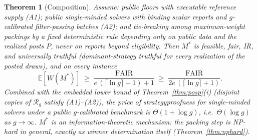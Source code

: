 \documentclass[11pt]{article}
\newtheorem{theorem}{Theorem}
\theoremstyle{remark}
\newcommand{\FAIR}{\mathrm{FAIR}}
\newcommand{\E}{\mathbb{E}}
\begin{document}
\begin{theorem}[Composition]\label{thm:composition}
Assume: public floors with executable reference supply (A1); public
single-minded solvers with binding scalar reports and $g$-calibrated
filter-passing batches (A2); and tie-breaking among maximum-weight
packings by a fixed deterministic rule depending only on public data and
the realized posts $P$, never on reports beyond eligibility. Then
$M^\ast$ is feasible, fair, IR, and universally truthful
(dominant-strategy truthful for every realization of the posted draws),
and on every instance
\[
\E[W(M^\ast)]\;\ge\;\frac{\FAIR}{e\,(\lceil\ln g\rceil+1)+1}
\;\ge\;\frac{\FAIR}{2e\,(\lceil\ln g\rceil+1)} .
\]
Combined with the embedded lower bound of Theorem~\ref{thm:posp}(i)
(disjoint copies of $\mathcal R_g$ satisfy (A1)--(A2)), the price of
strategyproofness for single-minded solvers under a public $g$-calibrated
benchmark is $\Theta(1+\log g)$, i.e.\ $\Theta(\log g)$ as
$g\to\infty$. $M^\ast$ is an information-theoretic mechanism: the
packing step is NP-hard in general, exactly as winner determination itself
(Theorem~\ref{thm:nphard}).
\end{theorem}
\end{document}
